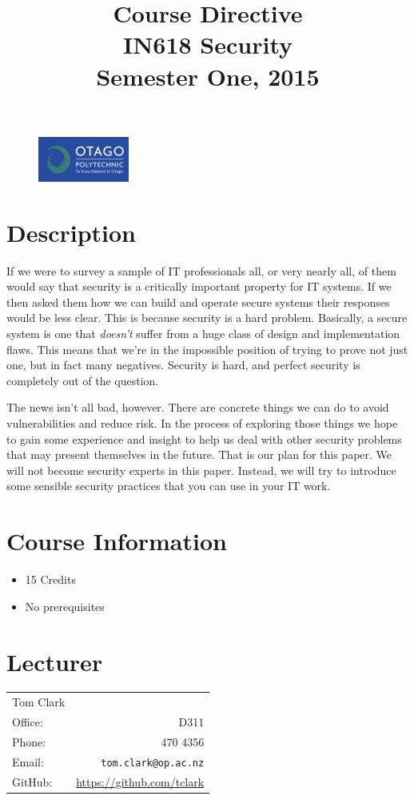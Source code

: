 \documentclass{article}
\begin{document}
\begin{figure}
\includegraphics[width=30mm]{../../../resources/images/oplogo.png}
\end{figure}

\title{Course Directive\\IN618 Security\\Semester One, 2015}
\date{}
\maketitle

\section*{Description}
If we were to survey a sample of IT professionals all, or very nearly all, of them would say that 
security is a critically important property for IT systems.  If we then asked them how we can
build and operate secure systems their responses would be less clear.  This is because security 
is a hard problem. Basically, a secure system is one that \emph{doesn't} suffer from a huge class
of design and implementation flaws.  This means that we're in the impossible position of trying to 
prove not just one, but in fact many negatives. Security is hard, and perfect security is completely 
out of the question.

The news isn't all bad, however. There are concrete things we can do to avoid vulnerabilities and
reduce risk. In the process of exploring those things we hope to gain some experience and insight
to help us deal with other security problems that may present themselves in the future. That is
our plan for this paper. We will not become security experts in this paper.  Instead, we will
try to introduce some sensible security practices that you can use in your IT work.


\section*{Course Information}
\begin{itemize}
  \item 15 Credits
  \item No prerequisites
\end{itemize}

\section*{Lecturer}
\begin{tabular}{lr}

  Tom Clark &    \\
     Office: & D311 \\
     Phone: & 470 4356 \\
     Email: & \texttt{tom.clark@op.ac.nz} \\
     GitHub: & \url{https://github.com/tclark} 
\end{tabular}
\end{document}
